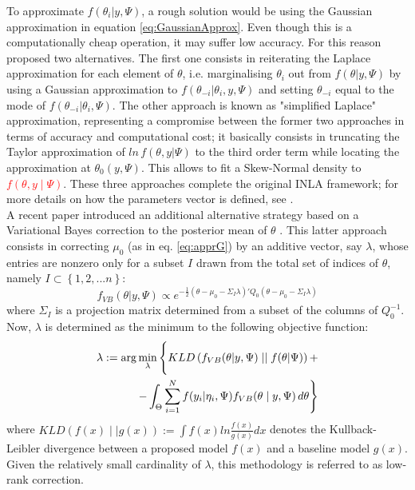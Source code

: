 \documentclass{book}
\begin{document}
To approximate $f(\theta_i|y, \Psi)$, a rough solution would be using the Gaussian approximation in equation \ref{eq:GaussianApprox}. Even though this is a computationally cheap operation, it may suffer low accuracy. For this reason \cite{INLA} proposed two alternatives. The first one consists in reiterating the Laplace approximation for each element of $\theta$, i.e. marginalising $\theta_i$ out from $f(\theta | y, \Psi)$ by using a Gaussian approximation to $f(\theta_{-i} | \theta_i, y, \Psi)$ and setting $\theta_{-i}$ equal to the mode of $f(\theta_{-i}|\theta_i, \Psi)$. The other approach is known as "simplified Laplace" approximation, representing a compromise between the former two approaches in terms of accuracy and computational cost; it basically consists in truncating the Taylor approximation of $ln\,f(\theta, y | \Psi)$ to the third order term while locating the approximation at $\theta_0(y, \Psi)$. This allows to fit a Skew-Normal density to \textcolor{red}{$f(\theta, y \mid \Psi)$}. These three approaches complete the original INLA framework; for more details on how the parameters vector is defined, see \cite{INLA2017}. \\A recent paper introduced an additional alternative strategy based on a Variational Bayes correction to the posterior mean of $\theta$ \cite{VB}. This latter approach consists in correcting $\mu_0$ (as in eq. \ref{eq:apprG}) by an additive vector, say $\lambda$, whose entries are nonzero only for a subset $I$ drawn from the total set of indices of $\theta$, namely $I \subset \left\{ 1, 2, ... n\right \}$:
$$
f_{VB}(\theta | y, \Psi) \propto e^{\displaystyle{
 - \frac{1}{2}(\theta - \mu_0 - \Sigma_I \lambda)'Q_0(\theta - \mu_0 - \Sigma_I \lambda)
}}
$$
where $\Sigma_I$ is a projection matrix determined from a subset of the columns of $Q_0^{-1}$. Now, $\lambda$ is determined as the minimum to the following objective function:
\begin{equation}
\begin{aligned}
\lambda := \arg \min_{\lambda} \Bigg{\lbrace}
KLD\left( f_{VB}(\theta | y, \Psi) \mid \mid f(\theta | \Psi)\right) + \\
-\int_{\Theta}  \sum_{i=1}^{N} f(y_i | \eta_i, \Psi) f_{VB}(\theta \mid y, \Psi)\, d \theta \Bigg{\rbrace}
\label{VBINLA}
\end{aligned}
\end{equation}
where $KLD(f(x) \mid \mid g(x)) := \int f(x) ln \displaystyle{\frac{f(x)}{g(x)}}  dx$ denotes the Kullback-Leibler divergence between a proposed model $f(x)$ and a baseline model $g(x)$. Given the relatively small cardinality of $\lambda$, this methodology is referred to as low-rank correction. \\
\end{document}
